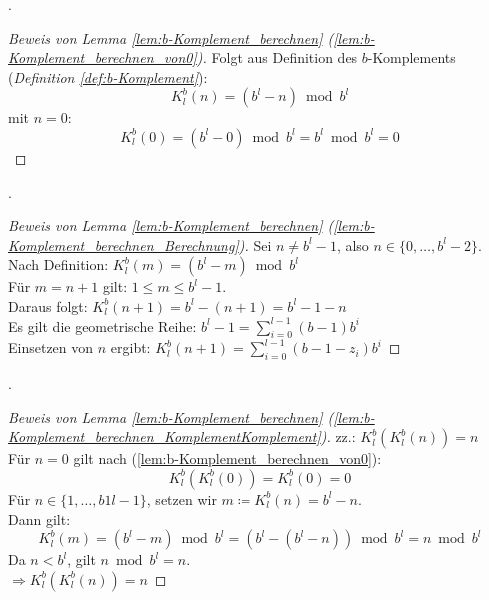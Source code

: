 \documentclass{beamer}
\newcommand{\subsecframe}{\begin{frame}{\insertsectionnumber.\insertsubsectionnumber \ \insertsubsection}}
\begin{document}
        \subsecframe
            \begin{proof}[Beweis von Lemma \ref{lem:b-Komplement_berechnen} (\ref{lem:b-Komplement_berechnen_von0})]
                Folgt aus Definition des $b$-Komplements (\textit{Definition \ref{def:b-Komplement}}):
                \[K_l^b(n) = (b^l-n) \bmod b^l\]
                mit $n=0$:
                \[K_l^b(0)=(b^l-0) \bmod b^l = b^l \bmod b^l = 0\]
            \end{proof}
        \end{frame}

        \subsecframe
            \begin{proof}[Beweis von Lemma \ref{lem:b-Komplement_berechnen} (\ref{lem:b-Komplement_berechnen_Berechnung})]
                Sei $n \neq b^l-1$, also $n\in \{0, \dots, b^l -2\}$. \\
                Nach Definition: $K_l^b(m) = (b^l - m) \bmod b^l$ \\
                \vspace{\baselineskip}
                Für $m = n + 1$ gilt: $1 \le m \le b^l - 1$. \\
                Daraus folgt: $K_l^b(n+1) = b^l - (n+1) = b^l - 1 - n$ \\
                \vspace{\baselineskip}
                Es gilt die geometrische Reihe: $b^l - 1 = \displaystyle\sum_{i=0}^{l-1} (b - 1)b^i$ \\
                \vspace{\baselineskip}
                Einsetzen von $n$ ergibt: $K_l^b(n+1) = \displaystyle\sum_{i=0}^{l-1} (b - 1 - z_i)b^i$
            \end{proof}
        \end{frame}

        \subsecframe
            \begin{proof}[Beweis von Lemma \ref{lem:b-Komplement_berechnen} (\ref{lem:b-Komplement_berechnen_KomplementKomplement})]
                zz.: $K_l^b(K_l^b(n)) = n$ \\
                \vspace{\baselineskip}
                Für $n=0$ gilt nach (\ref{lem:b-Komplement_berechnen_von0}): 
                \[K^b_l(K^b_l(0)) = K^b_l(0) = 0\]
                Für $n \in \{1, \dots, b1{l-1}\}$, setzen wir $m \coloneq K_l^b(n) = b^l -n$. \\
                Dann gilt:
                \[K_l^b(m) = (b^l - m) \bmod b^l = (b^l - (b^l - n)) \bmod b^l = n \bmod b^l\]
                Da $n < b^l$, gilt $n \bmod b^l = n$. \\
                $\Rightarrow K_l^b(K_l^b(n)) = n$
            \end{proof}
        \end{frame}
\end{document}
